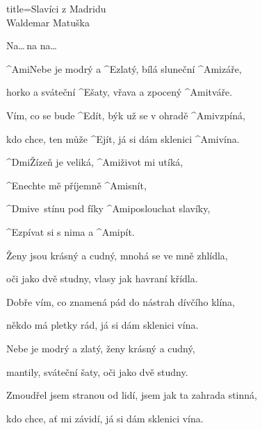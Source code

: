 \begin{song}{title=\predtitle\centering Slavíci z Madridu \\\large Waldemar Matuška \vspace*{-0.3cm}}  %
\begin{centerjustified}

	Na\elipsa\dots\,na na\elipsa\dots

\sloka
	^{Ami\z}Nebe je modrý a ^{E\z}zlatý, bílá sluneční ^{Ami\z}záře,\:\:

	horko a sváteční ^{E\z}šaty, vřava a zpocený ^{Ami\z}tváře.

	Vím, co se bude ^{E}dít, býk už se v ohradě ^{Ami\z}vzpíná,

	kdo chce, ten může ^{E\z}jít, já si dám sklenici ^{Ami\z}vína.

	^{Dmi\z}Žízeň je veliká, ^{Ami\z}život mi utíká,

	^{E\z}nechte mě příjemně ^{Ami\z}snít,

	^{Dmi\z}ve~stínu pod fíky ^{Ami\z}poslouchat slavíky,

	^{E\z}zpívat si s nima a ^{Ami\z}pít.\:\:\:\:\:

\sloka
	Ženy jsou krásný a cudný, mnohá se ve mně zhlídla,

	oči jako dvě studny, vlasy jak havraní křídla.

	Dobře vím, co znamená pád do nástrah dívčího klína,

	někdo má pletky rád, já si dám sklenici vína.


\sloka
	Nebe je modrý a zlatý, ženy krásný a cudný,

	mantily, sváteční šaty, oči jako dvě studny.

	Zmoudřel jsem stranou od lidí, jsem jak ta zahrada stinná,

	kdo chce, ať mi závidí, já si dám sklenici vína.
	


\end{centerjustified}

\centering
{}

\setcounter{Slokočet}{0}
\end{song}
